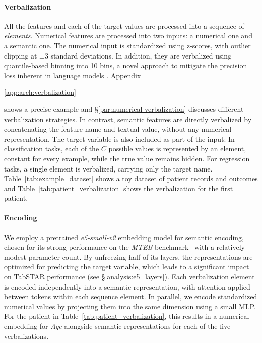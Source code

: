 \documentclass{article}
\newif\ifappendicesincluded
\newcommand{\appref}[1]{%
  \ifappendicesincluded
    \ref{#1}%
  \else
    \ref*{#1}%
  \fi
}
\begin{document}
\paragraph{Verbalization}\label{sec:arch:verbalization}
All the features and each of the target values are processed into a sequence of \textit{elements}. Numerical features are processed into two inputs: a numerical one and a semantic one. The numerical input is standardized using z-scores, with outlier clipping at ±3 standard deviations. In addition, they are verbalized using quantile-based binning into 10 bins, a novel approach to mitigate the precision loss inherent in language models \cite{thawani_representing_2021}. Appendix~\appref{app:arch:verbalization} shows a precise example and \S\ref{par:numerical-verbalization} discusses different verbalization strategies. In contrast, semantic features are directly verbalized by concatenating the feature name and textual value, without any numerical representation. The target variable is also included as part of the input: In classification tasks, each of the $C$ possible values is represented by an element, constant for every example, while the true value remains hidden. For regression tasks, a single element is verbalized, carrying only the target name. \hyperref[tab:example_dataset]{Table~\ref*{tab:example_dataset}} shows a toy dataset of patient records and outcomes and Table~\ref{tab:patient_verbalization} shows the verbalization for the first patient.

\paragraph{Encoding} We employ a pretrained \textit{e5-small-v2} \cite{wang_text_2024} embedding model for semantic encoding, chosen for its strong performance on the \textit{MTEB} benchmark~\cite{muennighoff_mteb_2023} with a relatively modest parameter count. By unfreezing half of its layers, the representations are optimized for predicting the target variable, which leads to a significant impact on TabSTAR performance (see \S\ref{analysis:e5_layers}). Each verbalization element is encoded independently into a semantic representation, with attention applied between tokens within each sequence element. In parallel, we encode standardized numerical values by projecting them into the same dimension using a small MLP. For the patient in Table~\ref{tab:patient_verbalization}, this results in a numerical embedding for \textit{Age} alongside semantic representations for each of the five verbalizations.
\end{document}
